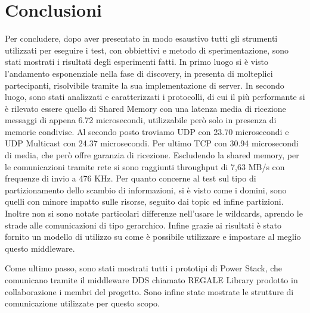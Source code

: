 \chapter{Conclusioni}
Per concludere, dopo aver presentato in modo esaustivo tutti gli strumenti utilizzati per eseguire i test, con obbiettivi e metodo di sperimentazione, sono stati mostrati i risultati degli esperimenti fatti. 
In primo luogo si è visto l'andamento esponenziale nella fase di discovery, in presenta di molteplici partecipanti, risolvibile tramite la sua implementazione di server.
In secondo luogo, sono stati analizzati e caratterizzati i protocolli, di cui il più performante si è rilevato essere quello di Shared Memory con una latenza media di ricezione messaggi di appena 6.72 microsecondi, utilizzabile però solo in presenza di memorie condivise.
Al secondo posto troviamo UDP con 23.70 microsecondi e UDP Multicast con 24.37 microsecondi. Per ultimo TCP con 30.94 microsecondi di media, che però offre garanzia di ricezione. Escludendo la shared memory, per le comunicazioni tramite rete si sono raggiunti throughput di 7,63 MB/s con frequenze di invio a 476 KHz.
Per quanto concerne al test sul tipo di partizionamento dello scambio di informazioni, si è visto come i domini, sono quelli con minore impatto sulle risorse, seguito dai topic ed infine partizioni. Inoltre non si sono notate particolari differenze nell'usare le wildcards, aprendo le strade alle comunicazioni di tipo gerarchico.
Infine grazie ai risultati è stato fornito un modello di utilizzo su come è possibile utilizzare e impostare al meglio questo middleware.

Come ultimo passo, sono stati mostrati tutti i prototipi di Power Stack, che comunicano tramite il middleware DDS chiamato REGALE Library prodotto in collaborazione i membri del progetto. Sono infine state mostrate le strutture di comunicazione utilizzate per questo scopo.

